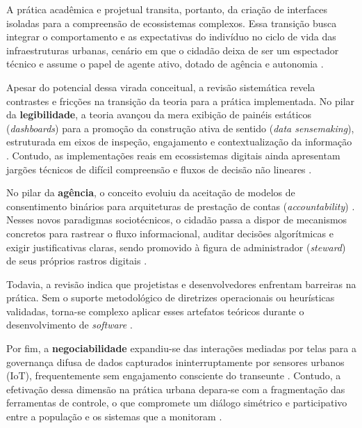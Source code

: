 \documentclass[12pt]{article}
\begin{document}
    A prática acadêmica e projetual transita, portanto, da criação de interfaces isoladas para a compreensão de ecossistemas complexos. Essa transição busca integrar o comportamento e as expectativas do indivíduo no ciclo de vida das infraestruturas urbanas, cenário em que o cidadão deixa de ser um espectador técnico e assume o papel de agente ativo, dotado de agência e autonomia \cite{Sailaja2021Designing, bavaresco2019technological}.

    Apesar do potencial dessa virada conceitual, a revisão sistemática revela contrastes e fricções na transição da teoria para a prática implementada. No pilar da \textbf{legibilidade}, a teoria avançou da mera exibição de painéis estáticos (\textit{dashboards}) para a promoção da construção ativa de sentido (\textit{data sensemaking}), estruturada em eixos de inspeção, engajamento e contextualização da informação \cite{Koesten2021}. Contudo, as implementações reais em ecossistemas digitais ainda apresentam jargões técnicos de difícil compreensão e fluxos de decisão não lineares \cite{Sailaja2021}.

    No pilar da \textbf{agência}, o conceito evoluiu da aceitação de modelos de consentimento binários para arquiteturas de prestação de contas (\textit{accountability}) \cite{janecek2018ownership}. Nesses novos paradigmas sociotécnicos, o cidadão passa a dispor de mecanismos concretos para rastrear o fluxo informacional, auditar decisões algorítmicas e exigir justificativas claras, sendo promovido à figura de administrador (\textit{steward}) de seus próprios rastros digitais \cite{angelopoulos2021stewardship}. 

    Todavia, a revisão indica que projetistas e desenvolvedores enfrentam barreiras na prática. Sem o suporte metodológico de diretrizes operacionais ou heurísticas validadas, torna-se complexo aplicar esses artefatos teóricos durante o desenvolvimento de \textit{software} \cite{Strey2019Human, Victorelli2020Human, chalhoub2024useful}. 

    Por fim, a \textbf{negociabilidade} expandiu-se das interações mediadas por telas para a governança difusa de dados capturados ininterruptamente por sensores urbanos (IoT), frequentemente sem engajamento consciente do transeunte \cite{Locoro2020}. Contudo, a efetivação dessa dimensão na prática urbana depara-se com a fragmentação das ferramentas de controle, o que compromete um diálogo simétrico e participativo entre a população e os sistemas que a monitoram \cite{Chatzimichali2021160}.
        
\end{document}
